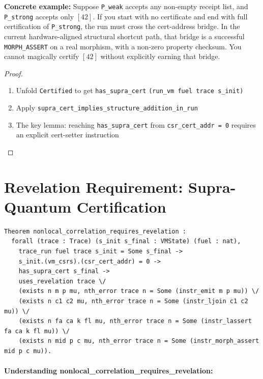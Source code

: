 \textbf{Concrete example:} Suppose \texttt{P\_weak} accepts any non-empty receipt list, and \texttt{P\_strong} accepts only $[42]$. If you start with no certificate and end with full certification of \texttt{P\_strong}, the run must cross the cert-address bridge. In the current hardware-aligned structural shortcut path, that bridge is a successful \texttt{MORPH\_ASSERT} on a real morphism, with a non-zero property checksum. You cannot magically certify $[42]$ without explicitly earning that bridge.

\begin{proof}
\begin{enumerate}
    \item Unfold \texttt{Certified} to get \texttt{has\_supra\_cert}
    \texttt{(run\_vm fuel trace s\_init)}
    \item Apply \texttt{supra\_cert\_implies\_structure\_addition\_in\_run}
    \item The key lemma: reaching \texttt{has\_supra\_cert} from \texttt{csr\_cert\_addr = 0} requires an explicit cert-setter instruction
\end{enumerate}
\end{proof}

\section{Revelation Requirement: Supra-Quantum Certification}

\begin{theorem}
\begin{lstlisting}
Theorem nonlocal_correlation_requires_revelation :
  forall (trace : Trace) (s_init s_final : VMState) (fuel : nat),
    trace_run fuel trace s_init = Some s_final ->
    s_init.(vm_csrs).(csr_cert_addr) = 0 ->
    has_supra_cert s_final ->
    uses_revelation trace \/
    (exists n m p mu, nth_error trace n = Some (instr_emit m p mu)) \/
    (exists n c1 c2 mu, nth_error trace n = Some (instr_ljoin c1 c2 mu)) \/
    (exists n fa ca k fl mu, nth_error trace n = Some (instr_lassert fa ca k fl mu)) \/
    (exists n mid p c mu, nth_error trace n = Some (instr_morph_assert mid p c mu)).
\end{lstlisting}
\end{theorem}

\paragraph{Understanding nonlocal\_correlation\_requires\_revelation:}

